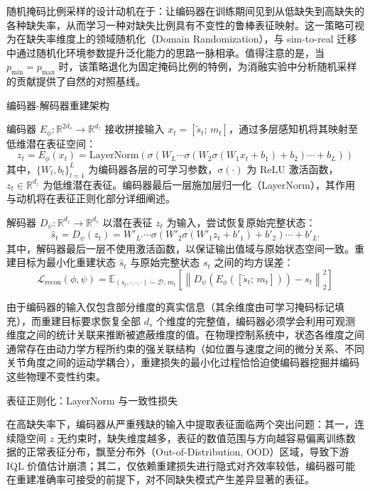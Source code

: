 随机掩码比例采样的设计动机在于：让编码器在训练期间见到从低缺失到高缺失的各种缺失率，从而学习一种对缺失比例具有不变性的鲁棒表征映射。这一策略可视为在缺失率维度上的领域随机化（Domain Randomization），与 sim-to-real 迁移中通过随机化环境参数提升泛化能力的思路一脉相承。值得注意的是，当 $p_{\min} = p_{\max}$ 时，该策略退化为固定掩码比例的特例，为消融实验中分析随机采样的贡献提供了自然的对照基线。

编码器-解码器重建架构

编码器 $E_\phi: \mathbb{R}^{2d_s} \to \mathbb{R}^{d_z}$ 接收拼接输入 $x_t = [\tilde{s}_t;\, m_t]$，通过多层感知机将其映射至低维潜在表征空间：
\begin{equation}
    z_t = E_\phi(x_t) = \text{LayerNorm}\!\left(\sigma\!\left(W_L \cdots \sigma\!\left(W_2 \sigma\!\left(W_1 x_t + b_1\right) + b_2\right) \cdots + b_L\right)\right)
\end{equation}
其中，$\{W_l, b_l\}_{l=1}^{L}$ 为编码器各层的可学习参数，$\sigma(\cdot)$ 为 ReLU 激活函数，$z_t \in \mathbb{R}^{d_z}$ 为低维潜在表征。编码器最后一层施加层归一化（LayerNorm），其作用与动机将在表征正则化部分详细阐述。

解码器 $D_\psi: \mathbb{R}^{d_z} \to \mathbb{R}^{d_s}$ 以潜在表征 $z_t$ 为输入，尝试恢复原始完整状态：
\begin{equation}
    \hat{s}_t = D_\psi(z_t) = W'_{L'} \cdots \sigma\!\left(W'_2 \sigma\!\left(W'_1 z_t + b'_1\right) + b'_2\right) \cdots + b'_{L'}
\end{equation}
其中，解码器最后一层不使用激活函数，以保证输出值域与原始状态空间一致。重建目标为最小化重建状态 $\hat{s}_t$ 与原始完整状态 $s_t$ 之间的均方误差：
\begin{equation}
    \mathcal{L}_{\text{recon}}(\phi, \psi) = \mathbb{E}_{(s_t, \cdot, \cdot, \cdot) \sim \mathcal{D},\, m_t}\!\left[\left\| D_\psi(E_\phi([\tilde{s}_t;\, m_t])) - s_t \right\|_2^2\right]
    \label{eq:recon_loss}
\end{equation}

由于编码器的输入仅包含部分维度的真实信息（其余维度由可学习掩码标记填充），而重建目标要求恢复全部 $d_s$ 个维度的完整值，编码器必须学会利用可观测维度之间的统计关联来推断被遮蔽维度的值。在物理控制系统中，状态各维度之间通常存在由动力学方程所约束的强关联结构（如位置与速度之间的微分关系、不同关节角度之间的运动学耦合），重建损失的最小化过程恰恰迫使编码器挖掘并编码这些物理不变性约束。

表征正则化：LayerNorm 与一致性损失

在高缺失率下，编码器从严重残缺的输入中提取表征面临两个突出问题：其一，连续隐空间 $z$ 无约束时，缺失维度越多，表征的数值范围与方向越容易偏离训练数据的正常表征分布，飘至分布外（Out-of-Distribution, OOD）区域，导致下游 IQL 价值估计崩溃；其二，仅依赖重建损失进行隐式对齐效率较低，编码器可能在重建准确率可接受的前提下，对不同缺失模式产生差异显著的表征。

